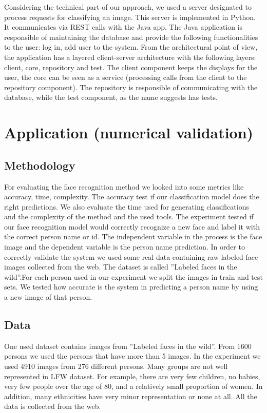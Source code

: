 \documentclass[runningheads,a4paper,11pt]{report}
\begin{document}
    Considering the technical part of our approach, we used a server designated to process requests for classifying an image. This server is implemented in Python. It communicates via REST calls with the Java app. The Java application is responsible of maintaining the database and provide the following functionalities to the user: log in, add user to the system. From the architectural point of view, the application has a layered client-server architecture with the following layers: client, core, repository and test. The client component keeps the displays for the user, the core can be seen as a service (processing calls from the client to the repository component). The repository is responsible of communicating with the database, while the test component, as the name suggests has tests.

    \chapter{Application (numerical validation)}
    \label{chapter:application}


    \section{Methodology}
    \label{section:methodology}

    For evaluating the face recognition method we looked into some metrics like accuracy, time, complexity. The accuracy test if our classification model does the right predictions. We also evaluate the time used for generating classifications and the complexity of the method and the used tools.
    The experiment tested if our face recognition model would correctly recognize a new face and label it with the correct person name or id.
    The independent variable in the process is the face image and the dependent variable is the person name prediction. In order to correctly validate the system we used some real data containing raw labeled face images collected from the web. The dataset is called ''Labeled faces in the wild''.For each person used in our experiment we split the images in train and test sets. We tested how accurate is the system in predicting a person name by using a new image of that person.


    \section{Data}
    \label{section:data}

    One used dataset contains images from ''Labeled faces in the wild''. From 1600 persons we used the persons that have more than 5 images. In the experiment we used 4910 images from 276 different persons. Many groups are not well represented in LFW dataset. For example, there are very few children, no babies, very few people over the age of 80, and a relatively small proportion of women. In addition, many ethnicities have very minor representation or none at all. All the data is collected from the web.
\end{document}
